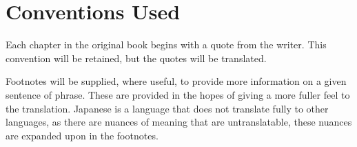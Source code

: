 \section*{Conventions Used}
Each chapter in the original book begins with a quote from the writer. This convention will be retained, but the quotes will be translated.
\par Footnotes will be supplied, where useful, to provide more information on a given sentence of phrase. These are provided in the hopes of giving a more fuller feel to the translation. Japanese is a language that does not translate fully to other languages, as there are nuances of meaning that are untranslatable, these nuances are expanded upon in the footnotes.

\theendnotes